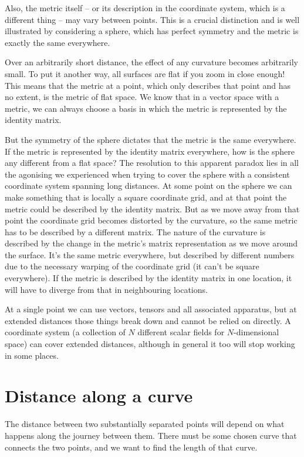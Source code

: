 Also, the metric itself -- or its description in the coordinate system, which is a different thing -- may vary between points. This is a crucial distinction and is well illustrated by considering a sphere, which has perfect symmetry and the metric is exactly the same everywhere.

Over an arbitrarily short distance, the effect of any curvature becomes arbitrarily small. To put it another way, all surfaces are flat if you zoom in close enough! This means that the metric at a point, which only describes that point and has no extent, is the metric of flat space. We know that in a vector space with a metric, we can always choose a basis in which the metric is represented by the identity matrix.

But the symmetry of the sphere dictates that the metric is the same everywhere. If the metric is represented by the identity matrix everywhere, how is the sphere any different from a flat space? The resolution to this apparent paradox lies in all the agonising we experienced when trying to cover the sphere with a consistent coordinate system spanning long distances. At some point on the sphere we can make something that is locally a square coordinate grid, and at that point the metric could be described by the identity matrix. But as we move away from that point the coordinate grid becomes distorted by the curvature, so the same metric has to be described by a different matrix. The nature of the curvature is described by the change in the metric's matrix representation as we move around the surface. It's the same metric everywhere, but described by different numbers due to the necessary warping of the coordinate grid (it can't be square everywhere). If the metric is described by the identity matrix in one location, it will have to diverge from that in neighbouring locations.

At a single point we can use vectors, tensors and all associated apparatus, but at extended distances those things break down and cannot be relied on directly. A coordinate system (a collection of $N$ different scalar fields for $N$-dimensional space) can cover extended distances, although in general it too will stop working in some places.

\section{Distance along a curve}

The distance between two substantially separated points will depend on what happens along the journey between them. There must be some chosen curve that connects the two points, and we want to find the length of that curve.

